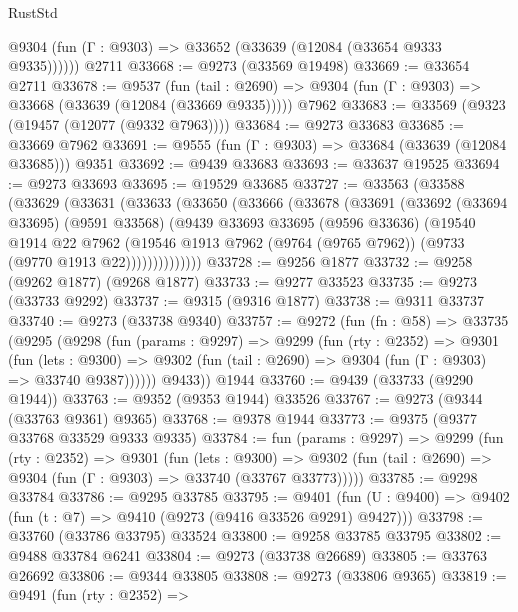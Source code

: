 \begin{lexlean}{RustStd}
\begin{coremodule}
{\begin{coremodule}
{{{{{{{{{{{{{{{{{{{{{{{{{{{{{{{{{{{{{{{{{{{{{{{{{{{{{{{      @9304 (fun (Γ : @9303) => @33652 (@33639 (@12084 (@33654 @9333 @9335))))))
    @2711
@33668 := @9273 (@33569 @19498)
@33669 := @33654 @2711
@33678 := @9537
    (fun (tail : @2690) => @9304 (fun (Γ : @9303) => @33668 (@33639 (@12084 (@33669 @9335)))))
    @7962
@33683 := @33569 (@9323 (@19457 (@12077 (@9332 @7963))))
@33684 := @9273 @33683
@33685 := @33669 @7962
@33691 := @9555 (fun (Γ : @9303) => @33684 (@33639 (@12084 @33685))) @9351
@33692 := @9439 @33683
@33693 := @33637 @19525
@33694 := @9273 @33693
@33695 := @19529 @33685
@33727 := @33563
    (@33588
      (@33629
        (@33631
          (@33633
            (@33650
              (@33666
                (@33678
                  (@33691
                    (@33692
                      (@33694 @33695)
                      (@9591 @33568)
                      (@9439
                        @33693
                        @33695
                        (@9596 @33636)
                        (@19540
                          @1914
                          @22
                          @7962
                          (@19546
                            @1913
                            @7962
                            (@9764 (@9765 @7962))
                            (@9733 (@9770 @1913 @22))))))))))))))
@33728 := @9256 @1877
@33732 := @9258 (@9262 @1877) (@9268 @1877)
@33733 := @9277 @33523
@33735 := @9273 (@33733 @9292)
@33737 := @9315 (@9316 @1877)
@33738 := @9311 @33737
@33740 := @9273 (@33738 @9340)
@33757 := @9272
    (fun (fn : @58) =>
    @33735
      (@9295
        (@9298
          (fun (params : @9297) =>
          @9299
            (fun (rty : @2352) =>
            @9301
              (fun (lets : @9300) =>
              @9302 (fun (tail : @2690) => @9304 (fun (Γ : @9303) => @33740 @9387))))))
        @9433))
    @1944
@33760 := @9439 (@33733 (@9290 @1944))
@33763 := @9352 (@9353 @1944) @33526
@33767 := @9273 (@9344 (@33763 @9361) @9365)
@33768 := @9378 @1944
@33773 := @9375 (@9377 @33768 @33529 @9333 @9335)
@33784 := fun (params : @9297) =>
  @9299
    (fun (rty : @2352) =>
    @9301
      (fun (lets : @9300) =>
      @9302 (fun (tail : @2690) => @9304 (fun (Γ : @9303) => @33740 (@33767 @33773)))))
@33785 := @9298 @33784
@33786 := @9295 @33785
@33795 := @9401
    (fun (U : @9400) => @9402 (fun (t : @7) => @9410 (@9273 (@9416 @33526 @9291) @9427)))
@33798 := @33760 (@33786 @33795) @33524
@33800 := @9258 @33785 @33795
@33802 := @9488 @33784 @6241
@33804 := @9273 (@33738 @26689)
@33805 := @33763 @26692
@33806 := @9344 @33805
@33808 := @9273 (@33806 @9365)
@33819 := @9491
    (fun (rty : @2352) =>
}}}}}}}}}}}}}}}}}}}}}}}}}}}}}}}}}}}}}}}}}}}}}}}}}}}}}}}
\end{coremodule}}
\end{coremodule}
\end{lexlean}
